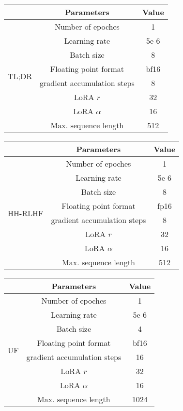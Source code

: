 \vspace{-2em}
\begin{table*}[htbp]
    \centering
    \begin{tabular}{ccc}
        \toprule & Parameters& Value\\
        \midrule
        \multirow{8}{*}[-0ex]{TL;DR} 
        & Number of epoches & 1\\
        & Learning rate & 5e-6\\
        & Batch size & 8\\
        & Floating point format & bf16\\
        & gradient accumulation steps & 8\\
        & LoRA \(r\) & 32 \\
        & LoRA \(\alpha\) & 16 \\
        & Max. sequence length & 512 \\
        \bottomrule
    \end{tabular}
    \vspace{1em}
    \begin{tabular}{ccc}
        \toprule & Parameters& Value\\
        \midrule
        \multirow{8}{*}[-0ex]{HH-RLHF} 
        & Number of epoches & 1\\
        & Learning rate & 5e-6\\
        & Batch size & 8\\
        & Floating point format & fp16\\
        & gradient accumulation steps & 8\\
        & LoRA \(r\) & 32 \\
        & LoRA \(\alpha\) & 16 \\
        & Max. sequence length & 512 \\
        \bottomrule
    \end{tabular}
    \begin{tabular}{ccc}
        \toprule & Parameters& Value\\
        \midrule
        \multirow{8}{*}[-0ex]{UF} 
        & Number of epoches & 1\\
        & Learning rate & 5e-6\\
        & Batch size & 4\\
        & Floating point format & bf16\\
        & gradient accumulation steps & 16\\
        & LoRA \(r\) & 32 \\
        & LoRA \(\alpha\) & 16 \\
        & Max. sequence length & 1024 \\
        \bottomrule
    \end{tabular}
    \caption{Training Hyperparameters for DPO models}
    \label{DPO training hyperparameters}
\end{table*}


